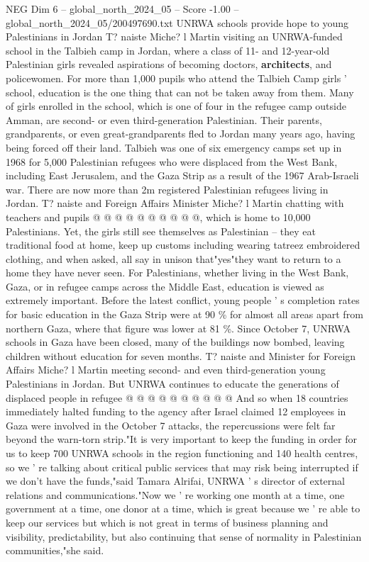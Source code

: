 \begin{textsample}{NEG Dim 6 – global\_north\_2024\_05 – Score -1.00 – global\_north\_2024\_05/200497690.txt}  \label{ex:f6_neg_300}
UNRWA schools provide hope to young Palestinians in Jordan T? naiste Miche? l Martin visiting an UNRWA-funded school in the Talbieh camp in Jordan, where a class of 11- and 12-year-old Palestinian girls revealed aspirations of becoming doctors, \textbf{architects}, and policewomen.
For more than 1,000 pupils who attend the Talbieh Camp girls ' school, education is the one thing that can not be taken away from them.
Many of girls enrolled in the school, which is one of four in the refugee camp outside Amman, are second- or even third-generation Palestinian.
Their parents, grandparents, or even great-grandparents fled to Jordan many years ago, having being forced off their land.
Talbieh was one of six emergency camps set up in 1968 for 5,000 Palestinian refugees who were displaced from the West Bank, including East Jerusalem, and the Gaza Strip as a result of the 1967 Arab-Israeli war.
There are now more than 2m registered Palestinian refugees living in Jordan.
T? naiste and Foreign Affairs Minister Miche? l Martin chatting with teachers and pupils @ @ @ @ @ @ @ @ @ @, which is home to 10,000 Palestinians.
Yet, the girls still see themselves as Palestinian -- they eat traditional food at home, keep up customs including wearing tatreez embroidered clothing, and when asked, all say in unison that"yes"they want to return to a home they have never seen.
For Palestinians, whether living in the West Bank, Gaza, or in refugee camps across the Middle East, education is viewed as extremely important.
Before the latest conflict, young people ' s completion rates for basic education in the Gaza Strip were at 90 \% for almost all areas apart from northern Gaza, where that figure was lower at 81 \%.
Since October 7, UNRWA schools in Gaza have been closed, many of the buildings now bombed, leaving children without education for seven months.
T? naiste and Minister for Foreign Affairs Miche? l Martin meeting second- and even third-generation young Palestinians in Jordan.
But UNRWA continues to educate the generations of displaced people in refugee @ @ @ @ @ @ @ @ @ @ And so when 18 countries immediately halted funding to the agency after Israel claimed 12 employees in Gaza were involved in the October 7 attacks, the repercussions were felt far beyond the warn-torn strip."It is very important to keep the funding in order for us to keep 700 UNRWA schools in the region functioning and 140 health centres, so we ' re talking about critical public services that may risk being interrupted if we don't have the funds,"said Tamara Alrifai, UNRWA ' s director of external relations and communications."Now we ' re working one month at a time, one government at a time, one donor at a time, which is great because we ' re able to keep our services but which is not great in terms of business planning and visibility, predictability, but also continuing that sense of normality in Palestinian communities,"she said.

\end{textsample}
